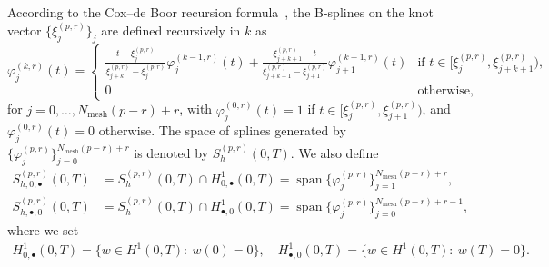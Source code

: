 \documentclass[addpoints,12pt,letter]{article}
\DeclareMathOperator{\spn}{span}
\DeclareMathOperator{\mesh}{mesh} %
\newcommand{\ds}{\displaystyle}
\newcommand{\ph}{\varphi}
\newcommand{\TF}{T}
\numberwithin{equation}{section}
\theoremstyle{definition}
\begin{document}
According to the Cox--de Boor recursion formula~\cite{dB01}, the B-splines on the knot vector $\{\xi_{j}^{(p,r)}\}_{j}$ are defined recursively in $k$ as
\begin{equation}\label{eq:41}
\ph_{j}^{(k,r)}(t)=
\begin{cases}
\ds\frac{t-\xi_{j}^{(p,r)}}{\xi^{(p,r)}_{j+k}-\xi^{(p,r)}_{j}}\ph_{j}^{(k-1,r)}(t)
+\ds\frac{\xi^{(p,r)}_{j+k+1}-t}{\xi^{(p,r)}_{j+k+1}-\xi^{(p,r)}_{j+1}}\ph_{j+1}^{(k-1,r)}(t)
&\text{if } t\in [\xi_{j}^{(p,r)},\xi^{(p,r)}_{j+k+1}),\\[3ex]
0 &\text{otherwise},
\end{cases}
\end{equation}
for $j=0,\ldots,N_{\mesh}(p-r)+r$, with $\ph_{j}^{(0,r)}(t)=1$ if $t\in [\xi_{j}^{(p,r)},\xi_{j+1}^{(p,r)})$, and $\ph_{j}^{(0,r)}(t)=0$ otherwise.
The space of splines generated by $\{\ph_{j}^{(p,r)}\}_{j=0}^{N_{\mesh}(p-r)+r}$ is denoted by $S_{h}^{(p,r)}(0,\TF)$.
We also define
\begin{equation}\label{eq:42}
\begin{aligned}
S_{h,0,\bullet}^{(p,r)}(0,\TF)
&=S_{h}^{(p,r)}(0,\TF )\cap H_{0,\bullet}^{1}(0,\TF)
=\spn\{\ph_{j}^{(p,r)}\}_{j=1}^{N_{\mesh}(p-r)+r},\\[2ex]
S_{h,\bullet,0}^{(p,r)}(0,\TF)
&=S_{h}^{(p,r)}(0,\TF )\cap H_{\bullet,0}^{1}(0,\TF)
=\spn\{\ph_{j}^{(p,r)}\}_{j=0}^{N_{\mesh}(p-r)+r-1},
\end{aligned}
\end{equation}
where we set
\begin{align*}
H^{1}_{0,\bullet}(0,\TF )=\{w\in H^{1}(0,\TF ):\ w(0)=0\},\quad
H^{1}_{\bullet,0}(0,\TF )=\{w\in H^{1}(0,\TF ):\ w(\TF)=0\}.
\end{align*}
\end{document}
